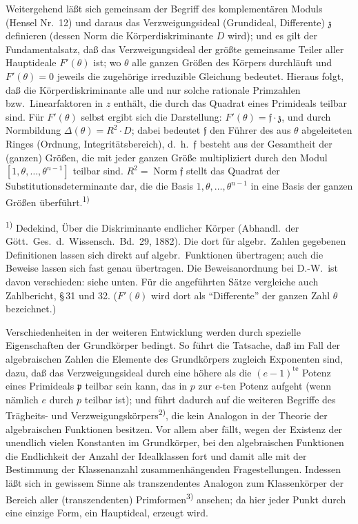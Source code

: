 \documentclass[12pt,a4paper]{article}
\begin{document}
Weitergehend l\"a\ss{}t sich gemeinsam der Begriff des komplement\"aren Moduls (Hensel Nr.\ 12) und daraus das Verzweigungsideal (Grundideal, Differente) $\mathfrak{z}$ definieren (dessen Norm die K\"orperdiskriminante $D$ wird); und es gilt der Fundamentalsatz, da\ss{} das Verzweigungsideal der gr\"o\ss{}te gemeinsame Teiler aller Hauptideale $F'(\theta)$ ist; wo $\theta$ alle ganzen Gr\"o\ss{}en des K\"orpers durchl\"auft und $F'(\theta)=0$ jeweils die zugeh\"orige irreduzible Gleichung bedeutet. Hieraus folgt, da\ss{} die K\"orperdiskriminante alle und nur solche rationale Primzahlen bzw.\ Linearfaktoren in $z$ enth\"alt, die durch das Quadrat eines Primideals teilbar sind. F\"ur $F'(\theta)$ selbst ergibt sich die Darstellung: $F'(\theta)=\mathfrak{f}\cdot\mathfrak{z}$, und durch Normbildung $\varDelta(\theta)=R^{2}\cdot D$; dabei bedeutet $\mathfrak{f}$ den F\"uhrer des aus $\theta$ abgeleiteten Ringes (Ordnung, Integrit\"atsbereich), d.\ h.\ $\mathfrak{f}$ besteht aus der Gesamtheit der (ganzen) Gr\"o\ss{}en, die mit jeder ganzen Gr\"o\ss{}e multipliziert durch den Modul $[1,\theta,\ldots,\theta^{n-1}]$ teilbar sind. $R^{2}=\operatorname{Norm}\mathfrak{f}$ stellt das Quadrat der Substitutionsdeterminante dar, die die Basis $1,\theta,\ldots,\theta^{n-1}$ in eine Basis der ganzen Gr\"o\ss{}en \"uberf\"uhrt.\textsuperscript{1)}

\smallskip
\noindent\textsuperscript{1)} Dedekind, \"Uber die Diskriminante endlicher K\"orper (Abhandl.\ der G\"ott.\ Ges.\ d.\ Wissensch.\ Bd.\ 29, 1882). Die dort f\"ur algebr.\ Zahlen gegebenen Definitionen lassen sich direkt auf algebr.\ Funktionen \"ubertragen; auch die Beweise lassen sich fast genau \"ubertragen. Die Beweisanordnung bei D.-W.\ ist davon verschieden: siehe unten. F\"ur die angef\"uhrten S\"atze vergleiche auch Zahlbericht, \S\,31 und 32. ($F'(\theta)$ wird dort als ``Differente'' der ganzen Zahl $\theta$ bezeichnet.)

Verschiedenheiten in der weiteren Entwicklung werden durch spezielle Eigenschaften der Grundk\"orper bedingt. So f\"uhrt die Tatsache, da\ss{} im Fall der algebraischen Zahlen die Elemente des Grundk\"orpers zugleich Exponenten sind, dazu, da\ss{} das Verzweigungsideal durch eine h\"ohere als die $(e-1)^{\mathrm{te}}$ Potenz eines Primideals $\mathfrak{p}$ teilbar sein kann, das in $p$ zur $e$-ten Potenz aufgeht (wenn n\"amlich $e$ durch $p$ teilbar ist); und f\"uhrt dadurch auf die weiteren Begriffe des Tr\"agheits- und Verzweigungsk\"orpers\textsuperscript{2)}, die kein Analogon in der Theorie der algebraischen Funktionen besitzen. Vor allem aber f\"allt, wegen der Existenz der unendlich vielen Konstanten im Grundk\"orper, bei den algebraischen Funktionen die Endlichkeit der Anzahl der Idealklassen fort und damit alle mit der Bestimmung der Klassenanzahl zusammenh\"angenden Fragestellungen. Indessen l\"a\ss{}t sich in gewissem Sinne als transzendentes Analogon zum Klassenk\"orper der Bereich aller (transzendenten) Primformen\textsuperscript{3)} ansehen; da hier jeder Punkt durch eine einzige Form, ein Hauptideal, erzeugt wird.
\end{document}
